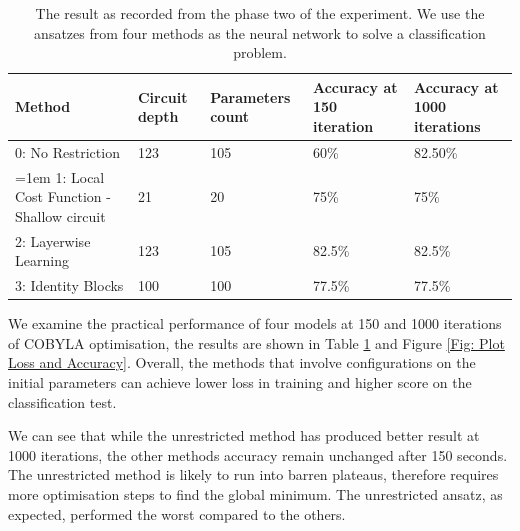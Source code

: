 \begin{table}
    \centering
    \begin{tabular}{|| p{4cm} p{2cm} p{2cm} p{2cm} p{2cm} ||}
        \hline
        \textbf{Method}                          & \textbf{Circuit depth} & \textbf{Parameters count} & \textbf{Accuracy at 150 iteration} & \textbf{Accuracy at 1000 iterations} \\
        \hline \hline
        0: No Restriction                        & 123                    & 105                       & 60\%                               & 82.50\%                              \\
        \raggedright
        \hangindent=1em
        \hangafter=1
        1: Local Cost Function - Shallow circuit & 21                     & 20                        & 75\%                               & 75\%                                 \\
        2: Layerwise Learning                    & 123                    & 105                       & 82.5\%                             & 82.5\%                               \\
        3: Identity Blocks                       & 100                    & 100                       & 77.5\%                             & 77.5\%                               \\
        \hline
    \end{tabular}
    \caption{
        The result as recorded from the phase two of the experiment.
        We use the ansatzes from four methods as the neural network to solve a classification problem.
    }
    \label{Tab: Experiment Phase 2 Res}
\end{table}

We examine the practical performance of four models at 150 and 1000 iterations of COBYLA optimisation, the results are shown in Table \ref{Tab: Experiment Phase 2 Res} and Figure \ref{Fig: Plot Loss and Accuracy}.
Overall, the methods that involve configurations on the initial parameters can achieve lower loss in training and higher score on the classification test.

We can see that while the unrestricted method has produced better result at 1000 iterations, the other methods accuracy remain unchanged after 150 seconds.
The unrestricted method is likely to run into barren plateaus, therefore requires more optimisation steps to find the global minimum.
The unrestricted ansatz, as expected, performed the worst compared to the others.

